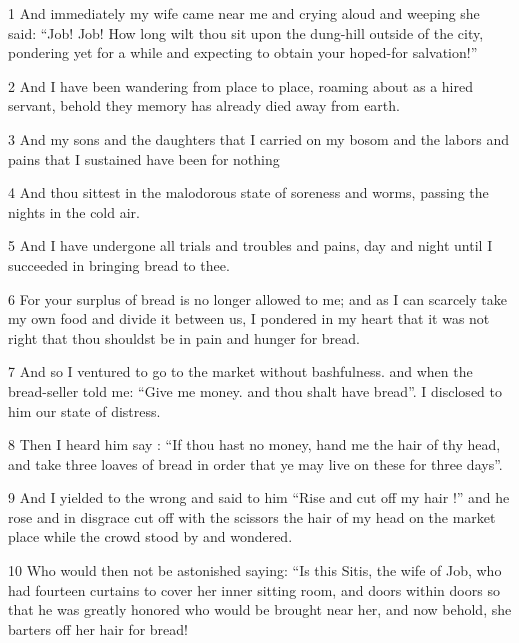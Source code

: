 \par 1 And immediately my wife came near me and crying aloud and weeping she said: “Job! Job! How long wilt thou sit upon the dung-hill outside of the city, pondering yet for a while and expecting to obtain your hoped-for salvation!”

\par 2 And I have been wandering from place to place, roaming about as a hired servant, behold they memory has already died away from earth.

\par 3 And my sons and the daughters that I carried on my bosom and the labors and pains that I sustained have been for nothing

\par 4 And thou sittest in the malodorous state of soreness and worms, passing the nights in the cold air.

\par 5 And I have undergone all trials and troubles and pains, day and night until I succeeded in bringing bread to thee.

\par 6 For your surplus of bread is no longer allowed to me; and as I can scarcely take my own food and divide it between us, I pondered in my heart that it was not right that thou shouldst be in pain and hunger for bread.

\par 7 And so I ventured to go to the market without bashfulness. and when the bread-seller told me: “Give me money. and thou shalt have bread”. I disclosed to him our state of distress.

\par 8 Then I heard him say : “If thou hast no money, hand me the hair of thy head, and take three loaves of bread in order that ye may live on these for three days”.

\par 9 And I yielded to the wrong and said to him “Rise and cut off my hair !” and he rose and in disgrace cut off with the scissors the hair of my head on the market place while the crowd stood by and wondered.

\par 10 Who would then not be astonished saying: “Is this Sitis, the wife of Job, who had fourteen curtains to cover her inner sitting room, and doors within doors so that he was greatly honored who would be brought near her, and now behold, she barters off her hair for bread!


